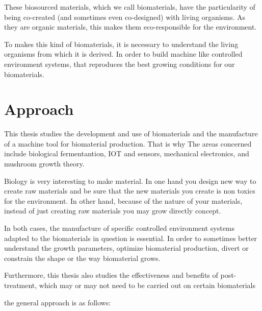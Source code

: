 These biosourced materials, which we call biomaterials, have the particularity of being co-created (and sometimes even co-designed) with living organisms. As they are organic materials, this makes them eco-responsible for the environment. 

To makes this kind of biomaterials, it is necessary to understand the living organisms from which it is derived. In order to build machine like controlled environment systems, that reproduces the best growing conditions for our biomaterials.

\section{Approach}
This thesis studies the development and use of biomaterials and the manufacture of a machine tool for biomaterial production.
That is why The areas concerned include biological fermentantion, IOT and sensors, mechanical electronics, and mushroom growth theory. 

Biology is very interesting to make material. In one hand you design new way to create raw materials and be sure that the new materials you create is non toxics for the environment. In other hand, because of the nature of your materials, instead of just creating raw materials you may grow directly concept. 

In both cases, the manufacture of specific controlled environment systems adapted to the biomaterials in question is essential. 
In order to sometimes better understand the growth parameters, optimize biomaterial production, divert or constrain the shape or the way biomaterial grows. 

Furthermore, this thesis also studies the effectiveness and benefits of post-treatment, which may or may not need to be carried out on certain biomaterials 

the general approach is as follows: 

